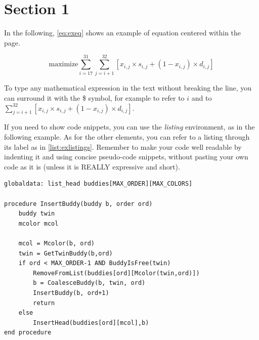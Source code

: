 \documentclass[12pt,oneside,a4paper]{article}
\begin{document}
\section{Section 1} \label{sec:sec1}
In the following, \cref{eq:exeq} shows an example of equation centered within the page.

\begin{equation}\label{eq:exeq}
%
\mbox{maximize} \sum_{i=17}^{31} \sum_{j=i+1}^{32} [ x_{i,j} \times s_{i,j} + (1 - x_{i,j}) \times d_{i,j} ]
%
\end{equation}

To type any mathematical expression in the text without breaking the line, you can surround it with the \$ symbol, for example to refer to $i$ and to $ \sum_{j=i+1}^{32} [ x_{i,j} \times s_{i,j} + (1 - x_{i,j}) \times d_{i,j} ] $.

If you need to show code snippets, you can use the \emph{listing} environment, as in the following example. As for the other elements, you can refer to a listing through its label as in \cref{list:exlistings}. Remember to make your code well readable by indenting it and using concise pseudo-code snippets, without pasting your own code as it is (unless it is REALLY expressive and short).

\begin{lstlisting}[label={list:exlistings},caption={Example of code snippet}]
globaldata: list_head buddies[MAX_ORDER][MAX_COLORS]

procedure InsertBuddy(buddy b, order ord)
	buddy twin
	mcolor mcol
	
	mcol = Mcolor(b, ord)
	twin = GetTwinBuddy(b,ord)	
	if ord < MAX_ORDER-1 AND BuddyIsFree(twin)
		RemoveFromList(buddies[ord][Mcolor(twin,ord)])
		b = CoalesceBuddy(b, twin, ord)
		InsertBuddy(b, ord+1)
		return
	else
		InsertHead(buddies[ord][mcol],b)
end procedure
\end{lstlisting}
\end{document}
